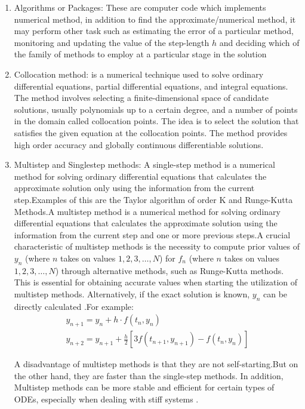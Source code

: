 \begin{enumerate}
  \item Algorithms or Packages: These are computer code which implements numerical method, in addition to find the approximate/numerical method, it may perform other task such as estimating the error of a particular method, monitoring and updating the value of the step-length $h$ and deciding which of the family of methods to employ at a particular stage in the solution \cite{lambert1977} 

  \item Collocation method:  is a numerical technique used to solve ordinary differential equations, partial differential equations, and integral equations. The method involves selecting a finite-dimensional space of candidate solutions, usually polynomials up to a certain degree, and a number of points in the domain called collocation points. The idea is to select the solution that satisfies the given equation at the collocation points. The method provides high order accuracy and globally continuous differentiable solutions. \cite{enwiki:1166346639}
  
  \item Multistep and Singlestep methods: A single-step method is a numerical method for solving ordinary differential equations that calculates the approximate solution only using the information from the current step.Examples of this are the Taylor algorithm of order K and Runge-Kutta Methods.A multistep method is a numerical method for solving ordinary differential equations that calculates the approximate solution using the information from the current step and one or more previous steps.A crucial characteristic of multistep methods is the necessity to compute prior values of \(y_n\) (where \(n\) takes on values \(1, 2, 3, \ldots, N\)) for \(f_n\) (where \(n\) takes on values \(1, 2, 3, \ldots, N\)) through alternative methods, such as Runge-Kutta methods. This is essential for obtaining accurate values when starting the utilization of multistep methods. Alternatively, if the exact solution is known, \(y_n\) can be directly calculated \cite{powerseriesJFatokun}.For example:
  \begin{eqnarray}
   y_{n+1} = y_n + h \cdot f(t_n, y_n) \\
   y_{n+2} = y_{n+1} + \frac{h}{2} \left[ 3f(t_{n+1}, y_{n+1}) - f(t_n, y_n) \right]
  \end{eqnarray}

  A disadvantage of multistep methods is that they are not self-starting.But on the other hand, they are faster than the single-step methods. In addition, Multistep methods can be more stable and efficient for certain types of ODEs, especially when dealing with stiff systems \cite{powerseriesJFatokun}.


\end{enumerate}
